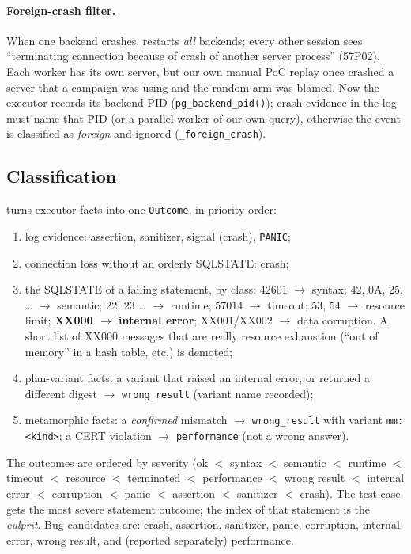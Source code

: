 \paragraph{Foreign-crash filter.} When one backend crashes, \pg restarts
\emph{all} backends; every other session sees ``terminating connection because
of crash of another server process'' (57P02). Each worker has its own server,
but our own manual PoC replay once crashed a server that a campaign was using
and the random arm was blamed. Now the executor records its backend PID
(\texttt{pg\_backend\_pid()}); crash evidence in the log must name that PID
(or a parallel worker of our own query), otherwise the event is classified
as \emph{foreign} and ignored (\texttt{\_foreign\_crash}).

\subsection{Classification}
\label{sec:classify}

 turns executor facts into one
\texttt{Outcome}, in priority order:
\begin{enumerate}
  \item log evidence: assertion, sanitizer, signal (crash), \texttt{PANIC};
  \item connection loss without an orderly SQLSTATE: crash;
  \item the SQLSTATE of a failing statement, by class:
    42601 $\rightarrow$ syntax; 42, 0A, 25, \dots{} $\rightarrow$ semantic;
    22, 23 \dots{} $\rightarrow$ runtime; 57014 $\rightarrow$ timeout;
    53, 54 $\rightarrow$ resource limit; \textbf{XX000 $\rightarrow$ internal
    error}; XX001/XX002 $\rightarrow$ data corruption. A short list of XX000
    messages that are really resource exhaustion (``out of memory'' in a
    hash table, etc.) is demoted;
  \item plan-variant facts: a variant that raised an internal error, or
    returned a different digest $\rightarrow$ \texttt{wrong\_result} (variant
    name recorded);
  \item metamorphic facts: a \emph{confirmed} mismatch $\rightarrow$
    \texttt{wrong\_result} with variant \texttt{mm:<kind>}; a CERT violation
    $\rightarrow$ \texttt{performance} (not a wrong answer).
\end{enumerate}
The outcomes are ordered by severity (ok $<$ syntax $<$ semantic $<$ runtime
$<$ timeout $<$ resource $<$ terminated $<$ performance $<$ wrong result $<$
internal error $<$ corruption $<$ panic $<$ assertion $<$ sanitizer $<$ crash).
The test case gets the most severe statement outcome; the index of that
statement is the \emph{culprit}. Bug candidates are: crash, assertion,
sanitizer, panic, corruption, internal error, wrong result, and (reported
separately) performance.

